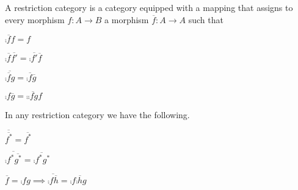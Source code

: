 \documentclass[runningheads,envcountsame]{llncs}
\begin{document}
\begin{definition}
    A restriction category is a category equipped with a mapping that assigns to every morphism $f\colon A \to B$ a morphism $\overline{f}\colon A \to A$ such that
    \begin{definitionlist}
        \item \label{def:restr-id} $\comp{\overline{f}}{f} = f$
        \item \label{def:restr-commute} $\comp{\overline{f}}{\overline{f'}} = \comp{\overline{f'}}{\overline{f}}$ 
        \item \label{def:restr-comp} $\overline{\comp{\overline{f}}{g}} = \comp{\overline{f}}{\overline{g}}$ 
        \item \label{def:restr-swap} $\comp{f}{\overline{g}} = \comp{\overline{\comp{f}{g}}}{f}$
    \end{definitionlist}
\end{definition}
\begin{lemma} In any restriction category we have the following.
    \begin{lemmalist}
        \item $\overline{\overline{f^*}} = \overline{f^*}$
        \item \label{lem:restr-comp} $\overline{\comp{f^*}{\overline{g^*}}} = \overline{\comp{f^*}{g^*}}$
        \item \label{lem:restr-insert} $\overline{f} = \comp{f}{g} \implies \overline{\comp{f}{\overline{h}}} = \comp{f}{\comp{\overline{h}}{g}}$
    \end{lemmalist}    
\end{lemma}
\end{document}
